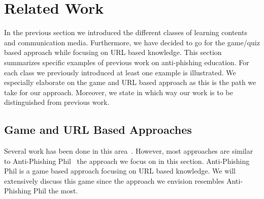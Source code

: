 
\section{Related Work}
\label{s:related_work}
In the previous section we introduced the different classes of learning contents and communication media. 
Furthermore, we have decided to go for the game/quiz based approach while focusing on URL based knowledge. 
This section summarizes specific examples of previous work on anti-phishing education.
For each class we previously introduced at least one example is illustrated. 
We especially elaborate on the game and URL based approach as this is the path we take for our approach. 
Moreover, we state in which way our work is to be distinguished from previous work. 

\subsection{Game and URL Based Approaches}
Several work has been done in this area~\cite{arachchilage2011designing,arachchilage2012designing}. 
However, most approaches are similar to Anti-Phishing Phil~\cite{sheng2007antiphishingphil} the approach we focus on in this section.
Anti-Phishing Phil is a game based approach focusing on URL based knowledge. 
We will extensively discuss this game since the approach we envision resembles Anti-Phishing Phil the most.

